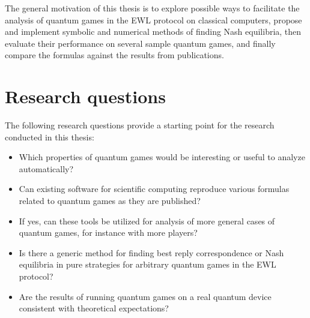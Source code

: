 \documentclass[../main.tex]{subfiles}
\begin{document}
The general motivation of this thesis is to explore possible ways to facilitate the analysis of quantum games in the EWL protocol on classical computers, propose and implement symbolic and numerical methods of finding Nash equilibria, then evaluate their performance on several sample quantum games, and finally compare the formulas against the results from publications.


\section{Research questions}

The following research questions provide a starting point for the research conducted in this thesis:
\begin{itemize}
\setlength\itemsep{0.05em}
    \item Which properties of quantum games would be interesting or useful to analyze automatically?
    \item Can existing software for scientific computing reproduce various formulas related to quantum games as they are published?
    \item If yes, can these tools be utilized for analysis of more general cases of quantum games, for instance with more players?
    \item Is there a generic method for finding best reply correspondence or Nash equilibria in pure strategies for arbitrary quantum games in the EWL protocol?
    \item Are the results of running quantum games on a real quantum device consistent with theoretical expectations?
\end{itemize}
\end{document}
